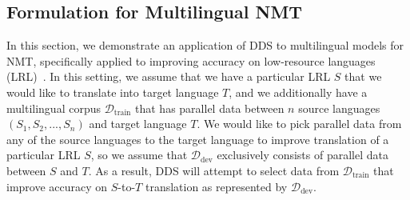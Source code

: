 \subsection{\label{sec:nmt_method}Formulation for Multilingual NMT}

In this section, we demonstrate an application of DDS to multilingual models for NMT, specifically applied to improving accuracy on low-resource languages (LRL)~\citep{nmt_transfer,rapid_adapt_nmt,johnson_nmt}.
In this setting, we assume that we have a particular LRL $S$ that we would like to translate into target language $T$, and we additionally have a multilingual corpus $\mathcal{D}_{\text{train}}$ that has parallel data between $n$ source languages $(S_1, S_2, ..., S_n)$ and target language $T$.
We would like to pick parallel data from any of the source languages to the target language to improve translation of a particular LRL $S$, so we assume that $\mathcal{D}_{\text{dev}}$ exclusively consists of parallel data between $S$ and $T$.
As a result, DDS will attempt to select data from $\mathcal{D}_{\text{train}}$ that improve accuracy on $S$-to-$T$ translation as represented by $\mathcal{D}_{\text{dev}}$.
